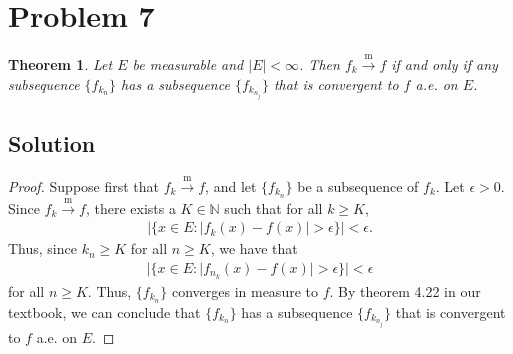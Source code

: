 \documentclass[10pt,a4paper]{article}
\theoremstyle{theorem}
\newtheorem{theorem}{Theorem}
\theoremstyle{definition}
\begin{document}
\section*{Problem 7}
\begin{theorem}
Let $E$ be measurable and $|E| < \infty$. Then $f_k \overset{\text{m}}{\to} f$ if and only if any subsequence $\{f_{k_n}\}$ has a subsequence $\{ f_{k_{n_j}} \}$ that is convergent to $f$ a.e. on $E$.
\end{theorem}

\subsection*{Solution}
\begin{proof}
Suppose first that $f_k \overset{\text{m}}{\to} f$, and let $\{f_{k_n}\}$ be a subsequence of $f_k$. Let $\epsilon > 0$. Since $f_k \overset{\text{m}}{\to} f$, there exists a $K \in \mathbb{N}$ such that for all $k \geq K$, 
\begin{align*}
|\{x \in E: |f_k(x) - f(x)| > \epsilon \}| < \epsilon.
\end{align*}
Thus, since $k_n \geq K$ for all $n \geq K$, we have that 
\begin{align*}
|\{x \in E: |f_{n_k}(x) - f(x)| > \epsilon \}| < \epsilon
\end{align*}
for all $n \geq K$. Thus, $\{f_{k_n}\}$ converges in measure to $f$. By theorem 4.22 in our textbook,  we can conclude that $\{f_{k_n}\}$ has a subsequence $\{ f_{k_{n_j}} \}$ that is convergent to $f$ a.e. on $E$.


\end{proof}
\end{document}
